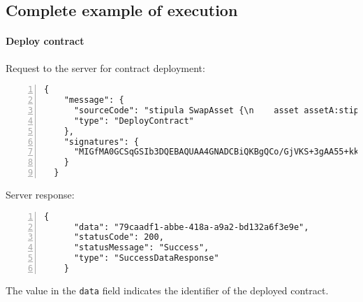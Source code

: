\subsection{Complete example of execution}
\label{app:asset-swap-event-complete-execution}

\paragraph{Deploy contract}

Request to the server for contract deployment:
{
  \small
  \begin{Verbatim}[numbers=left,xleftmargin=1cm,firstnumber=1,breaklines=true,breakanywhere=true,tabsize=2]
    {
    "message": {
      "sourceCode": "stipula SwapAsset {\n    asset assetA:stipula_assetA_ed8i9wk, assetB:stipula_assetB_pl1n5cc\n    field amountAssetA, amountAssetB, waitTimeBeforeSwapping\n    init Inactive\n\n    agreement (Alice, Bob)(amountAssetA, amountAssetB, waitTimeBeforeSwapping) {\n        Alice, Bob: amountAssetA, amountAssetB, waitTimeBeforeSwapping\n    } ==> @Inactive\n\n    @Inactive Alice : depositAssetA()[y]\n        (y == amountAssetA) {\n            y -o assetA;\n            _\n    } ==> @Deposit\n\n    @Deposit Bob : depositAssetB()[y]\n        (y == amountAssetB) {\n            y -o assetB;\n            now + waitTimeBeforeSwapping >>\n                @Swap {\n                    assetB -o Alice\n                    assetA -o Bob\n                } ==> @End\n    } ==> @Swap\n}",
      "type": "DeployContract"
    },
    "signatures": {
      "MIGfMA0GCSqGSIb3DQEBAQUAA4GNADCBiQKBgQCo/GjVKS+3gAA55+kko41yINdOcCLQMSBQyuTTkKHE1mhu/TgOpivM0wLPsSga8hQMr3+v3aR0IF/vfCRf6SdiXmWx/jflmEXtnT6fkGcnV6dGNUpHWXSpwUIDt0N88jfnEqekx4S+KDCKg99sGEeHeT65fKS8lB0gjHMt9AOriwIDAQAB": "MXw6Xje7jDsbk0Cqfrx6z2pWZiUchw8i9+KsYQ5KPVNic4YQtYYn0Ei64YulnpdNS/jTUxMuJnxW8dOAItDbPeR233731Lh3clnR1xWhRezUBNIF0ZAL2iqVHgaHUYeVNXBaZz1QR+xuj1srSarugnX4LshvZSXGTUUR/U7W4bE="
    }
  }
  \end{Verbatim}
}

Server response:
{
  \small
  \begin{Verbatim}[numbers=left,xleftmargin=1cm,firstnumber=1,breaklines=true,breakanywhere=true,tabsize=2]
    {
      "data": "79caadf1-abbe-418a-a9a2-bd132a6f3e9e",
      "statusCode": 200,
      "statusMessage": "Success",
      "type": "SuccessDataResponse"
    }
  \end{Verbatim}
}

The value in the \verb|data| field indicates the identifier of the deployed contract.

